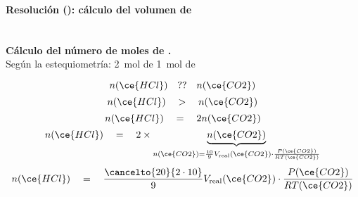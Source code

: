 \begin{frame}
    \frametitle{\ejerciciocmd}
    \framesubtitle{Resolución (): cálculo del volumen de }
     \textbf{}\\[.3cm]
     \textbf{Cálculo del número de moles de .}\\
    \centering Según la estequiometría: \SI{2}{\mol} de  \ce{->} \SI{1}{\mol} de 
    \begin{overprint}
            $$
                n(\ce{HCl})
                \quad ??\quad 
                n(\ce{CO2})
            $$
            $$
                n(\ce{HCl})
                \quad >\quad 
                n(\ce{CO2})
            $$
            $$
                n(\ce{HCl})
                \quad =\quad 
                2n(\ce{CO2})
            $$
            $$
                n(\ce{HCl})
                \quad =\quad 
                2\times\underbrace{n(\ce{CO2})}_{n(\ce{CO2}) = \frac{10}{9}V_{\text{real}}(\ce{CO2})\cdot\frac{P(\ce{CO2})}{RT(\ce{CO2})}}
            $$
            $$
                n(\ce{HCl})
                \quad =\quad 
                \frac{\cancelto{20}{2\cdot 10}}{9}V_{\text{real}}(\ce{CO2})\cdot\frac{P(\ce{CO2})}{RT(\ce{CO2})}
            $$
    \end{overprint}
\end{frame}

